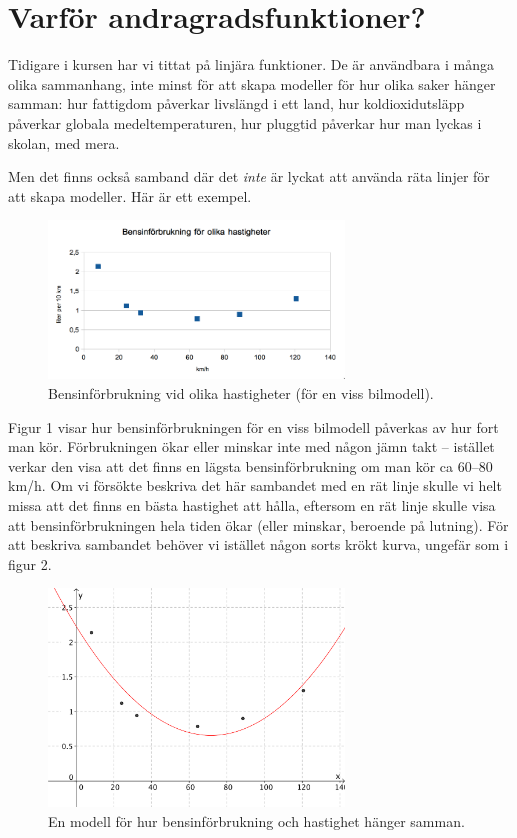 \section{Varför andragradsfunktioner?}

Tidigare i kursen har vi tittat på linjära funktioner.
De är användbara i många olika sammanhang, inte minst för att skapa modeller för hur olika saker hänger samman:
hur fattigdom påverkar livslängd i ett land, hur koldioxidutsläpp påverkar globala medeltemperaturen, hur pluggtid påverkar hur man lyckas i skolan, med mera.

Men det finns också samband där det \emph{inte} är lyckat att använda räta linjer för att skapa modeller.
Här är ett exempel.

\begin{figure}
  \centering
  \includegraphics[width=0.7\textwidth]{bilder/bensinforbr.png}
  \caption{\label{fig:bensinforbr}Bensinförbrukning vid olika hastigheter (för en viss bilmodell).}
\end{figure}

Figur 1 visar hur bensinförbrukningen för en viss bilmodell påverkas av hur fort man kör.
Förbrukningen ökar eller minskar inte med någon jämn takt -- istället verkar den visa att det finns en lägsta bensinförbrukning om man kör ca 60--80 km/h.
Om vi försökte beskriva det här sambandet med en rät linje skulle vi helt missa att det finns en bästa hastighet att hålla, eftersom en rät linje skulle visa att bensinförbrukningen hela tiden ökar (eller minskar, beroende på lutning).
För att beskriva sambandet behöver vi istället någon sorts krökt kurva, ungefär som i figur 2.

\begin{figure}
  \centering
  \includegraphics[width=0.7\textwidth]{bilder/bensinforbr-reg.png}
  \caption{\label{fig:bensinforbr-reg}En modell för hur bensinförbrukning och hastighet hänger samman.}
\end{figure}


